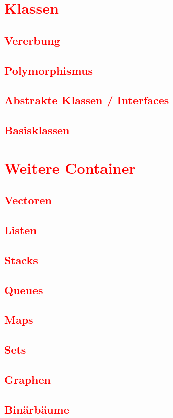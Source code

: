 \section{\textcolor{red}{Klassen}}\label{sec:classes-2}
\subsection{\textcolor{red}{Vererbung}}\label{sec:inheritance}
\subsection{\textcolor{red}{Polymorphismus}}\label{sec:polymorphism}
\subsection{\textcolor{red}{Abstrakte Klassen / Interfaces}}\label{sec:abstract-classes}
\subsection{\textcolor{red}{Basisklassen}}\label{sec:base-classes}
\section{\textcolor{red}{Weitere Container}}\label{sec:containers}
\subsection{\textcolor{red}{Vectoren}}\label{sec:vectors}
\subsection{\textcolor{red}{Listen}}\label{sec:lists}
\subsection{\textcolor{red}{Stacks}}\label{sec:stacks}
\subsection{\textcolor{red}{Queues}}\label{sec:queues}
\subsection{\textcolor{red}{Maps}}\label{sec:maps}
\subsection{\textcolor{red}{Sets}}\label{sec:sets}
\subsection{\textcolor{red}{Graphen}}\label{sec:trees}
\subsection{\textcolor{red}{Binärbäume}}\label{sec:binary-trees}

